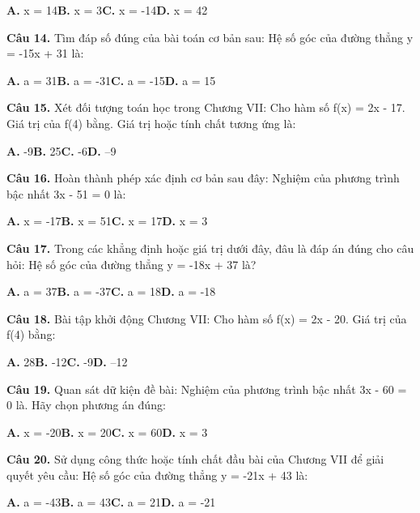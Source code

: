 \documentclass[11pt,a4paper]{article}
\begin{document}
\hspace*{1.5em}\textbf{A.} x = 14\quad\quad \textbf{B.} x = 3\quad\quad \textbf{C.} x = -14\quad\quad \textbf{D.} x = 42\par\vspace{2pt}
\textbf{\color{primary} Câu 14.} Tìm đáp số đúng của bài toán cơ bản sau: Hệ số góc của đường thẳng y = -15x + 31 là:\par
\hspace*{1.5em}\textbf{A.} a = 31\quad\quad \textbf{B.} a = -31\quad\quad \textbf{C.} a = -15\quad\quad \textbf{D.} a = 15\par\vspace{2pt}
\textbf{\color{primary} Câu 15.} Xét đối tượng toán học trong Chương VII: Cho hàm số f(x) = 2x - 17. Giá trị của f(4) bằng. Giá trị hoặc tính chất tương ứng là:\par
\hspace*{1.5em}\textbf{A.} -9\quad\quad \textbf{B.} 25\quad\quad \textbf{C.} -6\quad\quad \textbf{D.} --9\par\vspace{2pt}
\textbf{\color{primary} Câu 16.} Hoàn thành phép xác định cơ bản sau đây: Nghiệm của phương trình bậc nhất 3x - 51 = 0 là:\par
\hspace*{1.5em}\textbf{A.} x = -17\quad\quad \textbf{B.} x = 51\quad\quad \textbf{C.} x = 17\quad\quad \textbf{D.} x = 3\par\vspace{2pt}
\textbf{\color{primary} Câu 17.} Trong các khẳng định hoặc giá trị dưới đây, đâu là đáp án đúng cho câu hỏi: Hệ số góc của đường thẳng y = -18x + 37 là?\par
\hspace*{1.5em}\textbf{A.} a = 37\quad\quad \textbf{B.} a = -37\quad\quad \textbf{C.} a = 18\quad\quad \textbf{D.} a = -18\par\vspace{2pt}
\textbf{\color{primary} Câu 18.} Bài tập khởi động Chương VII: Cho hàm số f(x) = 2x - 20. Giá trị của f(4) bằng:\par
\hspace*{1.5em}\textbf{A.} 28\quad\quad \textbf{B.} -12\quad\quad \textbf{C.} -9\quad\quad \textbf{D.} --12\par\vspace{2pt}
\textbf{\color{primary} Câu 19.} Quan sát dữ kiện đề bài: Nghiệm của phương trình bậc nhất 3x - 60 = 0 là. Hãy chọn phương án đúng:\par
\hspace*{1.5em}\textbf{A.} x = -20\quad\quad \textbf{B.} x = 20\quad\quad \textbf{C.} x = 60\quad\quad \textbf{D.} x = 3\par\vspace{2pt}
\textbf{\color{primary} Câu 20.} Sử dụng công thức hoặc tính chất đầu bài của Chương VII để giải quyết yêu cầu: Hệ số góc của đường thẳng y = -21x + 43 là:\par
\hspace*{1.5em}\textbf{A.} a = -43\quad\quad \textbf{B.} a = 43\quad\quad \textbf{C.} a = 21\quad\quad \textbf{D.} a = -21\par\vspace{2pt}
\end{document}
